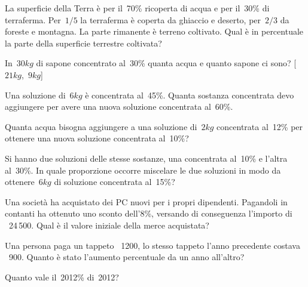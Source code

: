 \begin{multicols}{2}
\begin{esercizio}
 \label{ese:3.107}
La superficie della Terra è per il~70\% ricoperta di acqua e per il~30\% 
di terraferma.
Per~\(1/5\) la terraferma è coperta da ghiaccio e deserto, per~\(2/3\) da 
foreste e montagna.
La parte rimanente è terreno coltivato. Qual è in percentuale la parte 
della superficie terrestre coltivata?
\end{esercizio}

\begin{esercizio}[\Ast]
 \label{ese:3.108}
In~\(30\unit{kg}\) di sapone concentrato al~30\% quanta acqua e quanto sapone 
ci sono? \hfill [\(21\unit{kg}\),~\(9\unit{kg}\)]
\end{esercizio}

\begin{esercizio}
 \label{ese:3.109}
Una soluzione di~\(6\unit{kg}\) è concentrata al~45\%. Quanta sostanza 
concentrata devo aggiungere per avere una nuova soluzione concentrata al~60\%.
\end{esercizio}

\begin{esercizio}
 \label{ese:3.110}
Quanta acqua bisogna aggiungere a una soluzione di~\(2\unit{kg}\)
concentrata al~12\% per ottenere una nuova soluzione concentrata al~10\%?
\end{esercizio}

\begin{esercizio}
 \label{ese:3.111}
Si hanno due soluzioni delle stesse sostanze, una concentrata al~10\% e 
l'altra al~30\%.
In quale proporzione occorre miscelare le due soluzioni in modo da 
ottenere~\(6\unit{kg}\) di soluzione concentrata al~15\%?
\end{esercizio}

\begin{esercizio}
 \label{ese:3.112}
Una società ha acquistato dei PC nuovi per i propri dipendenti. 
Pagandoli in contanti ha ottenuto uno sconto dell'8\%,
versando di conseguenza l'importo di \officialeuro\ 24\,500. 
Qual è il valore iniziale della merce acquistata?
\end{esercizio}

\begin{esercizio}
 \label{ese:3.113}
Una persona paga un tappeto \officialeuro\ 1200, lo stesso tappeto 
l'anno precedente costava \officialeuro\ 900.
Quanto è stato l'aumento percentuale da un anno all'altro?
\end{esercizio}

\begin{esercizio}
 \label{ese:3.114}
Quanto vale il~2012\% di~2012?
\end{esercizio}
\end{multicols}

